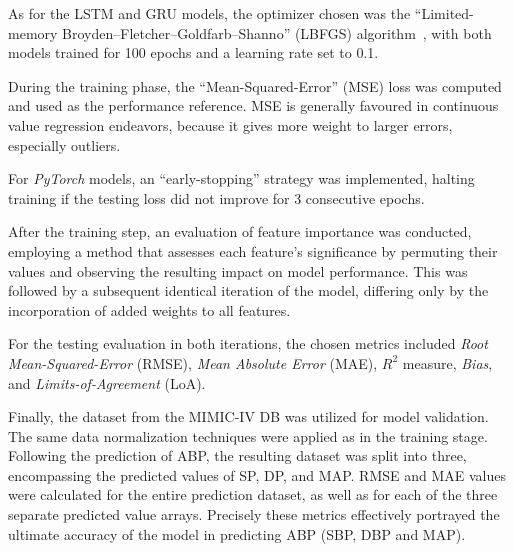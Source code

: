 As for the LSTM and GRU models, the optimizer chosen was the \enquote{Limited-memory Broyden–Fletcher–Goldfarb–Shanno} (LBFGS) algorithm~\cite{LBFGSPyTorchDocumentation},
with both models trained for 100 epochs and a learning rate set to 0.1.

During the training phase, the \enquote{Mean-Squared-Error} (MSE) loss was computed and used as the performance reference.
MSE is generally favoured in continuous value regression endeavors, because it gives more weight to larger errors, especially outliers.

For \textit{PyTorch} models, an \enquote{early-stopping} strategy was implemented, halting training if the testing loss did not improve for 3 consecutive epochs.

After the training step, an evaluation of feature importance was conducted, employing a method that assesses each feature's significance by permuting their values and observing the resulting impact on model performance.
This was followed by a subsequent identical iteration of the model, differing only by the incorporation of added weights to all features.

For the testing evaluation in both iterations, the chosen metrics included \textit{Root Mean-Squared-Error} (RMSE), \textit{Mean Absolute Error} (MAE), \textit{$R^2$} measure, \textit{Bias}, and \textit{Limits-of-Agreement} (LoA).

Finally, the dataset from the MIMIC-IV DB was utilized for model validation.
The same data normalization techniques were applied as in the training stage.
Following the prediction of ABP, the resulting dataset was split into three, encompassing the predicted values of SP, DP, and MAP\@.
RMSE and MAE values were calculated for the entire prediction dataset, as well as for each of the three separate predicted value arrays.
Precisely these metrics effectively portrayed the ultimate accuracy of the model in predicting ABP (SBP, DBP and MAP).
